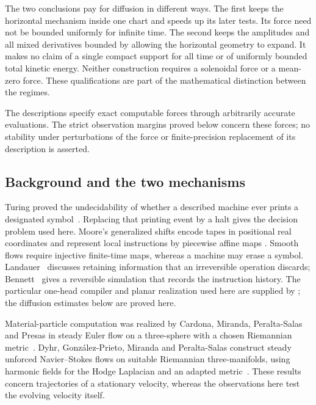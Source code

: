 \documentclass[11pt]{article}
\theoremstyle{definition}
\theoremstyle{remark}
\begin{document}
The two conclusions pay for diffusion in different ways. The first
keeps the horizontal mechanism inside one chart and speeds up its
later tests. Its force need not be bounded uniformly for infinite time.
The second keeps the amplitudes and all mixed derivatives bounded by
allowing the horizontal geometry to expand. It makes no claim of a
single compact support for all time or of uniformly bounded total
kinetic energy. Neither construction requires a solenoidal force or a
mean-zero force. These qualifications are part of the mathematical
distinction between the regimes.

The descriptions specify exact computable forces through arbitrarily
accurate evaluations. The strict observation margins proved below
concern these forces; no stability under perturbations of the force
or finite-precision replacement of its description is asserted.

\subsection{Background and the two mechanisms}

Turing proved the undecidability of whether a described machine ever
prints a designated symbol~\cite[Section~8]{Turing1936}. Replacing that
printing event by a halt gives the decision problem used here.
Moore's generalized shifts encode tapes in positional real coordinates
and represent local instructions by piecewise affine maps
\cite{Moore1990,Moore1991}. Smooth flows require injective finite-time
maps, whereas a machine may erase a symbol.
Landauer~\cite[Section~3]{Landauer1961} discusses retaining information
that an irreversible operation discards; Bennett~\cite{Bennett1973}
gives a reversible simulation that records the instruction history.
The particular one-head compiler and planar realization used here are
supplied by \cite[Lemma~3.1 and Theorem~4.1]{stationary2026}; the
diffusion estimates below are proved here.

Material-particle computation was realized by Cardona, Miranda,
Peralta-Salas and Presas in steady Euler flow on a three-sphere with a
chosen Riemannian metric~\cite[Theorem~6.1]{CardonaEtAl2021}.
Dyhr, Gonz\'alez-Prieto, Miranda and Peralta-Salas construct steady
unforced Navier--Stokes flows on suitable Riemannian three-manifolds,
using harmonic fields for the Hodge Laplacian and an adapted
metric~\cite[Theorem~A]{DyhrEtAl2026}.
These results concern trajectories of a stationary velocity, whereas
the observations here test the evolving velocity itself.
\end{document}

